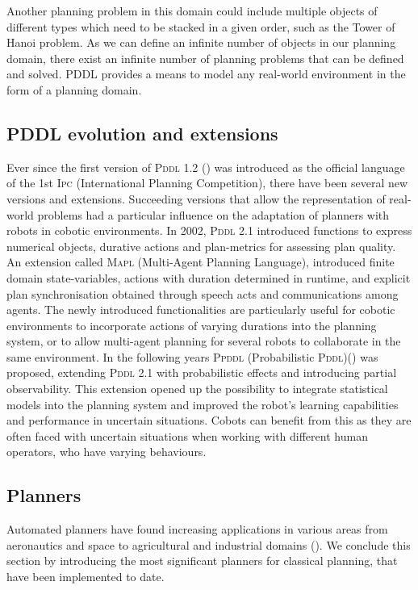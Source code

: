 Another planning problem in this domain could include multiple objects of different types which need to be stacked in a given order, such as the Tower of Hanoi problem.
As we can define an infinite number of objects in our planning domain, there exist an infinite number of planning problems that can be defined and solved. 
PDDL provides a means to model any real-world environment in the form of a planning domain. 


\subsection{PDDL evolution and extensions}\label{subsec:PDDL evolution}

Ever since the first version of \textsc{Pddl} 1.2 (\cite{mcdermott1998pddl}) was introduced as the official language of the 1st \textsc{Ipc} (International Planning Competition), there have been several new versions and extensions.
Succeeding versions that allow the representation of real-world problems had a particular influence on the adaptation of planners with robots in cobotic environments. In 2002, \textsc{Pddl} 2.1 introduced functions to express numerical objects, durative actions and plan-metrics for assessing plan quality. 
An extension called \textsc{Mapl} (Multi-Agent Planning Language), introduced finite domain state-variables, actions with duration determined in runtime, and explicit plan synchronisation obtained through speech acts and communications among agents. 
The newly introduced functionalities are particularly useful for cobotic environments to incorporate actions of varying durations into the planning system, or to allow multi-agent planning for several robots to collaborate in the same environment.
In the following years \textsc{Ppddl} (Probabilistic \textsc{Pddl})(\cite{younes:04a}) was proposed, extending \textsc{Pddl} 2.1 with probabilistic effects and introducing partial observability. This extension opened up the possibility to integrate statistical models into the planning system and improved the robot's learning capabilities and performance in uncertain situations. Cobots can benefit from this as they are often faced with uncertain situations when working with different human operators, who have varying behaviours.

\subsection{Planners}\label{subsec:Planners}
Automated planners have found increasing applications in various areas from aeronautics and space to agricultural and industrial domains (\cite{aarup1992optimum}). 
We conclude this section by introducing the most significant planners for classical planning, that have been implemented to date. 

